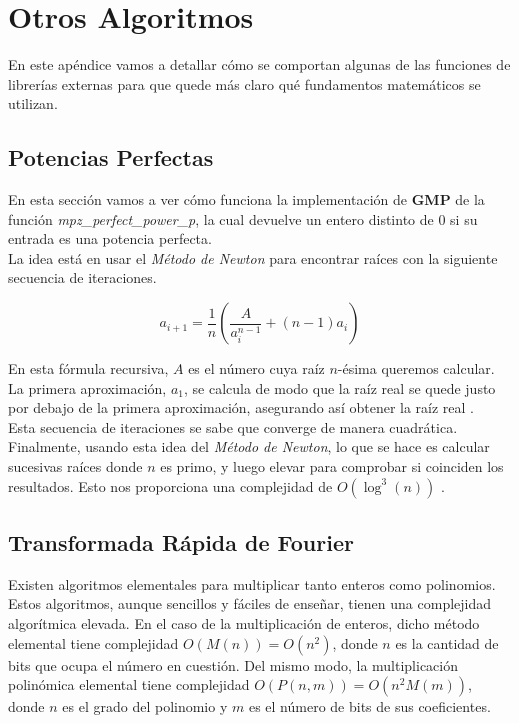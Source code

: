 
\chapter{Otros Algoritmos}\label{otros_algoritmos}

En este apéndice vamos a detallar cómo se comportan algunas de las funciones de librerías externas para que quede más claro qué fundamentos matemáticos se utilizan.

\section{Potencias Perfectas}

En esta sección vamos a ver cómo funciona la implementación de \textbf{GMP} de la función \textit{mpz\_perfect\_power\_p}, la cual devuelve un entero distinto de $0$ si su entrada es una potencia perfecta.\\

La idea está en usar el \textit{Método de Newton} para encontrar raíces con la siguiente secuencia de iteraciones.

\begin{equation}
a_{i+1} = \frac{1}{n}\left(\frac{A}{a_i^{n-1}} + (n-1)a_i\right)
\end{equation}

En esta fórmula recursiva, $A$ es el número cuya raíz $n$-ésima queremos calcular. La primera aproximación, $a_1$, se calcula de modo que la raíz real se quede justo por debajo de la primera aproximación, asegurando así obtener la raíz real \cite{gmp_man_2020}.\\

Esta secuencia de iteraciones se sabe que converge de manera cuadrática.\\

Finalmente, usando esta idea del \textit{Método de Newton}, lo que se hace es calcular sucesivas raíces donde $n$ es primo, y luego elevar para comprobar si coinciden los resultados. Esto nos proporciona una complejidad de $O(\log^3(n))$ \cite{bach_sorenson_1989}.

\section{Transformada Rápida de Fourier}

Existen algoritmos elementales para multiplicar tanto enteros como polinomios. Estos algoritmos, aunque sencillos y fáciles de enseñar, tienen una complejidad algorítmica elevada. En el caso de la multiplicación de enteros, dicho método elemental tiene complejidad $O(M(n)) = O(n^2)$, donde $n$ es la cantidad de bits que ocupa el número en cuestión. Del mismo modo, la multiplicación polinómica elemental tiene complejidad $O(P(n, m)) = O(n^2M(m))$, donde $n$ es el grado del polinomio y $m$ es el número de bits de sus coeficientes.\\

